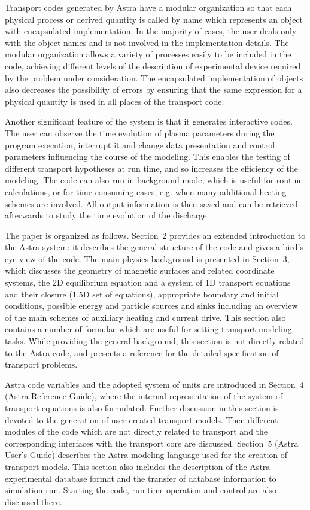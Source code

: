 Transport codes generated by Astra have a modular organization so that
each physical process or derived quantity is called by name which
represents an object with encapsulated implementation. 
In the majority of cases, the user deals only with the object names and
is not involved in the implementation details.  
The modular organization allows a variety of processes easily to be 
included in the code, achieving different levels of the description of 
experimental device required by the problem under consideration. 
The encapsulated implementation of objects also decreases the 
possibility of errors by ensuring that the same expression for a physical 
quantity is used in all places of the transport code.

Another significant feature of the system is that it generates
interactive codes. 
The user can observe the time evolution of plasma parameters during the
program execution, interrupt it and change data presentation and control
parameters influencing the course of the modeling. 
This enables the testing of different transport hypotheses at run time,
and so increases the efficiency of the modeling. 
The code can also run in background mode, which is useful for routine
calculations, or for time consuming cases, e.g. when many
additional heating schemes are involved. 
All output information is then saved and can be retrieved afterwards to
study the time evolution of the discharge.

The paper is organized as follows.
Section~2 provides an extended introduction to the Astra system:
it describes the general structure of the code and gives a bird's eye
view of the code. 
The main physics background is presented in Section~3, which discusses
the geometry of magnetic surfaces and related coordinate systems,
the 2D equilibrium equation and a system of 1D transport equations and
their closure (1.5D set of equations), 
appropriate boundary and initial conditions,
possible energy and particle sources and sinks including an
overview of the main schemes of auxiliary heating and current drive.
This section also contains a number of formulae which are useful for
setting transport modeling tasks. 
While providing the general background, this section is not directly
related to the Astra code, and presents a reference for the detailed
specification of transport problems. 

Astra code variables and the adopted system of units are introduced in
Section~4 (Astra Reference Guide), where the internal representation of
the system of transport equations is also formulated. 
Further discussion in this section is devoted to the generation
of user created transport models. 
Then different modules of the code which are not directly related to
transport and 
the corresponding interfaces with the transport core are discussed. 
Section~5 (Astra User's Guide) describes the Astra modeling
language used for the creation of transport models.
This section also includes the description of the Astra experimental
database format and the transfer of database information to simulation
run. 
Starting the code, run-time operation and control are also discussed
there. 

